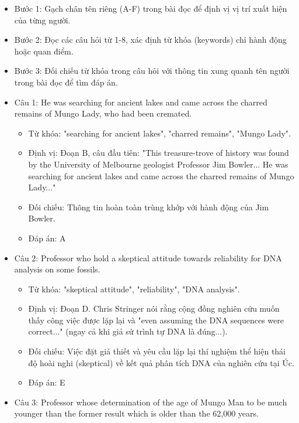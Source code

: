 \documentclass{../templateReading/cdreading}
\begin{document}
\begin{itemize}
\item Bước 1: Gạch chân tên riêng (A-F) trong bài đọc để định vị vị trí xuất hiện của từng người.
\item Bước 2: Đọc các câu hỏi từ 1-8, xác định từ khóa (keywords) chỉ hành động hoặc quan điểm.
\item Bước 3: Đối chiếu từ khóa trong câu hỏi với thông tin xung quanh tên người trong bài đọc để tìm đáp án.
\end{itemize}

\begin{itemize}
\item Câu 1: He was searching for ancient lakes and came across the charred remains of Mungo Lady, who had been cremated.
\begin{itemize}
\item Từ khóa: "searching for ancient lakes", "charred remains", "Mungo Lady".
\item Định vị: Đoạn B, câu đầu tiên: "This treasure-trove of history was found by the University of Melbourne geologist Professor Jim Bowler... He was searching for ancient lakes and came across the charred remains of Mungo Lady..."
\item Đối chiếu: Thông tin hoàn toàn trùng khớp với hành động của Jim Bowler.
\item Đáp án: A
\end{itemize}
\item Câu 2: Professor who hold a skeptical attitude towards reliability for DNA analysis on some fossils.
\begin{itemize}
\item Từ khóa: "skeptical attitude", "reliability", "DNA analysis".
\item Định vị: Đoạn D. Chris Stringer nói rằng cộng đồng nghiên cứu muốn thấy công việc được lặp lại và "even assuming the DNA sequences were correct..." (ngay cả khi giả sử trình tự DNA là đúng...).
\item Đối chiếu: Việc đặt giả thiết và yêu cầu lặp lại thí nghiệm thể hiện thái độ hoài nghi (skeptical) về kết quả phân tích DNA của nghiên cứu tại Úc.
\item Đáp án: E
\end{itemize}
\item Câu 3: Professor whose determination of the age of Mungo Man to be much younger than the former result which is older than the 62,000 years.
\begin{itemize}

\end{itemize}
\end{itemize}
\end{document}
